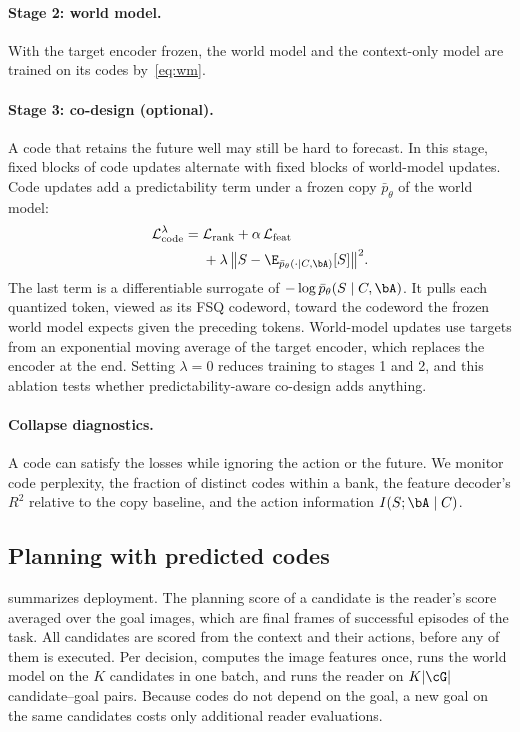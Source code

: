\paragraph{Stage 2: world model.}
With the target encoder frozen, the world model and the context-only model are trained on its codes by~\eqref{eq:wm}.

\paragraph{Stage 3: co-design (optional).}
A code that retains the future well may still be hard to forecast.
In this stage, fixed blocks of code updates alternate with fixed blocks of world-model updates.
Code updates add a predictability term under a frozen copy $\bar p_\theta$ of the world model:
\begin{equation}
\begin{aligned}
  \mathcal{L}^{\lambda}_{\mathrm{code}}={}&\mathcal{L}_{\mathrm{rank}}+\alpha\,\mathcal{L}_{\mathrm{feat}}\\
  &+\lambda\,\big\lVert S-\E_{\bar p_\theta(\cdot\mid C,\bA)}[S]\big\rVert^2.
\end{aligned}
  \label{eq:source}
\end{equation}
The last term is a differentiable surrogate of $-\log\bar p_\theta(S\mid C,\bA)$.
It pulls each quantized token, viewed as its FSQ codeword, toward the codeword the frozen world model expects given the preceding tokens.
World-model updates use targets from an exponential moving average of the target encoder, which replaces the encoder at the end.
Setting $\lambda{=}0$ reduces training to stages 1 and 2, and this ablation tests whether predictability-aware co-design adds anything.

\paragraph{Collapse diagnostics.}
A code can satisfy the losses while ignoring the action or the future.
We monitor code perplexity, the fraction of distinct codes within a bank, the feature decoder's $R^2$ relative to the copy baseline, and the action information $I(S;\bA\mid C)$.

\subsection{Planning with predicted codes}
\label{sec:planning}
 summarizes deployment.
The planning score of a candidate is the reader's score averaged over the goal images, which are final frames of successful episodes of the task.
All candidates are scored from the context and their actions, before any of them is executed.
Per decision, \method computes the image features once, runs the world model on the $K$ candidates in one batch, and runs the reader on $K|\cG|$ candidate--goal pairs.
Because codes do not depend on the goal, a new goal on the same candidates costs only additional reader evaluations.

